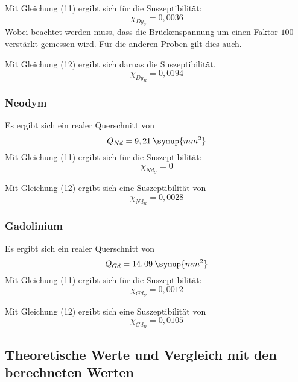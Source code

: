 Mit Gleichung (11) ergibt sich für die Suszeptibilität:
\begin{equation*}
  \chi_{Dy_U} = 0,0036 %
\end{equation*}
Wobei beachtet werden muss, dass die Brückenspannung um einen Faktor $100$ verstärkt gemessen wird. Für die anderen
Proben gilt dies auch.

Mit Gleichung (12) ergibt sich daruas die Suszeptibilität.
\begin{equation*}
  \chi_{Dy_R} = 0,0194  %
\end{equation*}

\subsubsection{Neodym}
Es ergibt sich ein realer Querschnitt von
\begin{equation*}
  Q_{Nd} = 9,21 \: \symup{mm^2} %
\end{equation*}
Mit Gleichung (11) ergibt sich für die Suszeptibilität:
\begin{equation*}
  \chi_{Nd_U} = 0 %
\end{equation*}

Mit Gleichung (12) ergibt sich eine Suszeptibilität von
\begin{equation*}
  \chi_{Nd_R} = 0,0028 %
\end{equation*}

\subsubsection{Gadolinium}
Es ergibt sich ein realer Querschnitt von
\begin{equation*}
  Q_{Gd} = 14,09 \: \symup{mm^2}  %
\end{equation*}
Mit Gleichung (11) ergibt sich für die Suszeptibilität:
\begin{equation*}
  \chi_{Gd_U} = 0,0012 %
\end{equation*}

Mit Gleichung (12) ergibt sich eine Suszeptibilität von
\begin{equation*}
  \chi_{Gd_R} = 0,0105 %
\end{equation*}


\subsection{Theoretische Werte und Vergleich mit den berechneten Werten}

